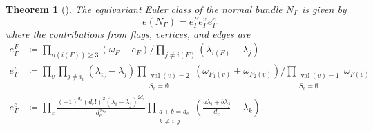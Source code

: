 \documentclass{report}
\theoremstyle{plain}
\newtheorem{theorem}{Theorem}[section]
\theoremstyle{definition}
\theoremstyle{remark}
\DeclareMathOperator{\val}{val}
\begin{document}
\begin{theorem}[{\cite[Section 3.3]{Kontsevich1995}}] \label{thm:euler-class-fixed-graph}
  The equivariant Euler class of the normal bundle $N_\Gamma$ is given
  by
  \[ e(N_\Gamma) = e_\Gamma^F e_\Gamma^v e_\Gamma^e \]
  where the contributions from flags, vertices, and edges are
  \begin{align*}
    e_\Gamma^F &\coloneqq \prod_{n(i(F)) \ge 3} (\omega_F - e_F) \Big/ \prod_{j \neq i(F)} (\lambda_{i(F)} - \lambda_j) \\
    e_\Gamma^v &\coloneqq \prod_v \prod_{j \neq i_v} (\lambda_{i_v} - \lambda_j) \prod_{\substack{\val(v) = 2\\S_v = \emptyset}} (\omega_{F_1(v)} + \omega_{F_2(v)}) \Big/ \prod_{\substack{\val(v) = 1\\S_v = \emptyset}} \omega_{F(v)} \\
    e_\Gamma^e &\coloneqq \prod_e \frac{(-1)^{d_e} (d_e!)^2 (\lambda_i - \lambda_j)^{2d_e}}{d_e^{2d_e}} \prod_{\substack{a+b=d_e\\k \neq i,j}} \left(\frac{a\lambda_i + b\lambda_j}{d_e} - \lambda_k\right).
  \end{align*}
\end{theorem}
\end{document}
